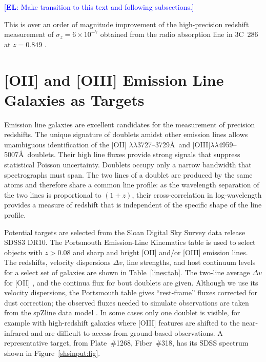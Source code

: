 \documentclass[preprint]{aastex}
\newcommand{\eric}[1]{\textcolor{blue}{[{\bf EL}: #1]}}
\begin{document}
\eric{Make transition to this text and following subsections.} 

This is over an order of magnitude improvement
of the high-precision redshift measurement of  $\sigma_z=6\times 10^{-7}$ obtained
from the radio absorption line in 3C~286 at $z=0.849$
\citep{1978ApJ...219....1D}.

\section{[OII] and [OIII] Emission Line Galaxies as Targets}
Emission line galaxies are excellent candidates for the measurement of precision redshifts.
The unique signature
of doublets amidst  other emission lines allows unambiguous identification of the [OII] $\lambda\lambda$3727--3729\AA\ 
and [OIII]$\lambda\lambda$4959--5007\AA\ doublets.
Their high line fluxes provide strong signals that suppress statistical Poisson uncertainty.
Doublets occupy only a narrow bandwidth that spectrographs must span.
The two lines of a doublet are produced by the same atoms and therefore
share a common line profile: as the wavelength separation of the two lines is proportional to $(1+z)$, their cross-correlation in log-wavelength
provides a measure of redshift that is independent of the specific shape of the line profile.

Potential targets are selected from the Sloan Digital Sky Survey data release SDSS3 DR10.  The  Portsmouth Emission-Line Kinematics table \citep{2013MNRAS.431.1383T}  is used to select
objects 
with $z>0.08$
and sharp and bright [OII] and/or [OIII] emission lines.
The redshifts, velocity dispersions $\Delta v$, line strengths, and host continuum levels for a select set of galaxies are shown in Table~\ref{lines:tab}. 
The two-line average $\Delta v$ for [OII] , and the continua flux for bout doublets  are given.
Although we use its velocity dispersions, the Portsmouth table  gives ``rest-frame'' fluxes corrected for dust correction;
the observed fluxes needed to simulate observations are taken from the spZline data model
\citep{2012AJ....144..144B}.  In some cases only one doublet is visible, for example with high-redshift galaxies where [OIII] features are shifted to the near-infrared and are difficult to access from ground-based observations.
A representative 
target, from Plate~\#1268, Fiber~\#318, has its  SDSS spectrum shown in Figure~\ref{shsinput:fig}.
\end{document}
